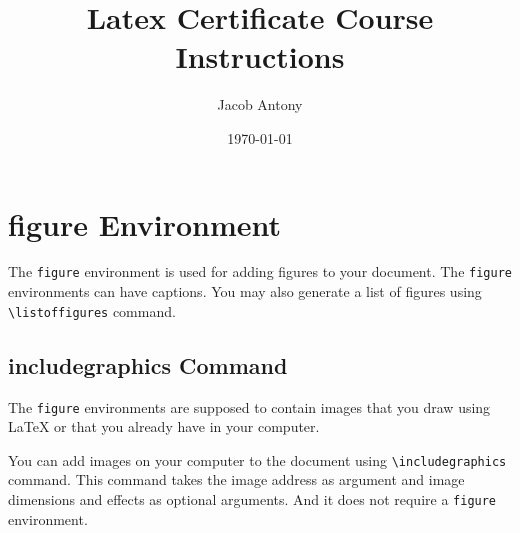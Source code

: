 \documentclass{article}
\title{Latex Certificate Course Instructions}
\author{Jacob Antony}
\date{\today}
\theoremstyle{definition}
\theoremstyle{remark}
\begin{document}
\maketitle

\section{figure Environment}
	The \texttt{figure} environment is used for adding figures to your document. The \texttt{figure} environments can have captions. You may also generate a list of figures using \texttt{\textbackslash listoffigures} command.

\subsection{includegraphics Command}
	The \texttt{figure} environments are supposed to contain images that you draw using \LaTeX{} or that you already have in your computer.
	
	You can add images on your computer to the document using \texttt{\textbackslash includegraphics} command. This command takes the image address as argument and image dimensions and effects as optional arguments. And it does not require a \texttt{figure} environment.
\end{document}
